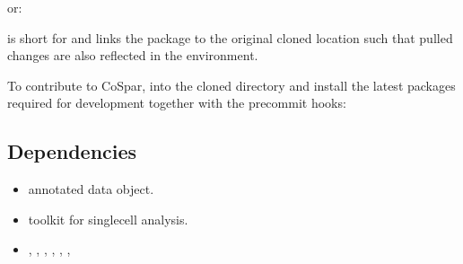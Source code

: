 \documentclass[letterpaper,10pt,english]{sphinxmanual}
\begin{document}
or:

\begin{sphinxVerbatim}[commandchars=\\\{\}]
  
   
\end{sphinxVerbatim}

 is short for  and links the package to the original cloned
location such that pulled changes are also reflected in the environment.

To contribute to CoSpar,  into the cloned directory and
install the latest packages required for development together with the pre\sphinxhyphen{}commit hooks:

\begin{sphinxVerbatim}[commandchars=\\\{\}]
   
 
\end{sphinxVerbatim}


\subsection{Dependencies}
\label{\detokenize{installation:dependencies}}\begin{itemize}
\item {} 
 \sphinxhyphen{} annotated data object.

\item {} 
 \sphinxhyphen{} toolkit for single\sphinxhyphen{}cell analysis.

\item {} 
, , , , , ,

\end{itemize}
\end{document}
